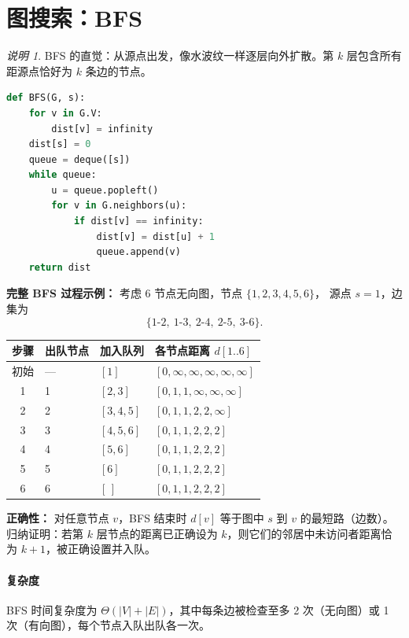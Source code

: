 \documentclass[UTF8,openany,12pt]{ctexbook}
\theoremstyle{remark}
\newtheorem{remark}{说明}[chapter]
\newcommand{\complexity}[1]{\paragraph{复杂度}#1}
\begin{document}
\section{图搜索：BFS}

\begin{remark}
BFS 的直觉：从源点出发，像水波纹一样逐层向外扩散。第 $k$ 层包含所有距源点恰好为 $k$ 条边的节点。
\end{remark}

\begin{lstlisting}[language=Python, caption={BFS 伪代码}]
def BFS(G, s):
    for v in G.V:
        dist[v] = infinity
    dist[s] = 0
    queue = deque([s])
    while queue:
        u = queue.popleft()
        for v in G.neighbors(u):
            if dist[v] == infinity:
                dist[v] = dist[u] + 1
                queue.append(v)
    return dist
\end{lstlisting}

\textbf{完整 BFS 过程示例：} 考虑 6 节点无向图，节点 $\{1,2,3,4,5,6\}$，
源点 $s=1$，边集为
\[
  \{1\text{-}2,\ 1\text{-}3,\ 2\text{-}4,\ 2\text{-}5,\ 3\text{-}6\}.
\]

\begin{center}
\begin{tabular}{@{}clll@{}}
\toprule
步骤 & 出队节点 & 加入队列 & 各节点距离 $d[1..6]$ \\
\midrule
初始 & --- & $[1]$ & $[0, \infty, \infty, \infty, \infty, \infty]$ \\
1    & 1   & $[2, 3]$    & $[0, 1, 1, \infty, \infty, \infty]$ \\
2    & 2   & $[3, 4, 5]$ & $[0, 1, 1, 2, 2, \infty]$ \\
3    & 3   & $[4, 5, 6]$ & $[0, 1, 1, 2, 2, 2]$ \\
4    & 4   & $[5, 6]$    & $[0, 1, 1, 2, 2, 2]$ \\
5    & 5   & $[6]$       & $[0, 1, 1, 2, 2, 2]$ \\
6    & 6   & $[\,]$      & $[0, 1, 1, 2, 2, 2]$ \\
\bottomrule
\end{tabular}
\end{center}

\textbf{正确性：} 对任意节点 $v$，BFS 结束时 $d[v]$ 等于图中 $s$ 到 $v$ 的最短路（边数）。归纳证明：若第 $k$ 层节点的距离已正确设为 $k$，则它们的邻居中未访问者距离恰为 $k+1$，被正确设置并入队。

\complexity{BFS 时间复杂度为 $\Theta(|V|+|E|)$，其中每条边被检查至多 2 次（无向图）或 1 次（有向图），每个节点入队出队各一次。}
\end{document}
